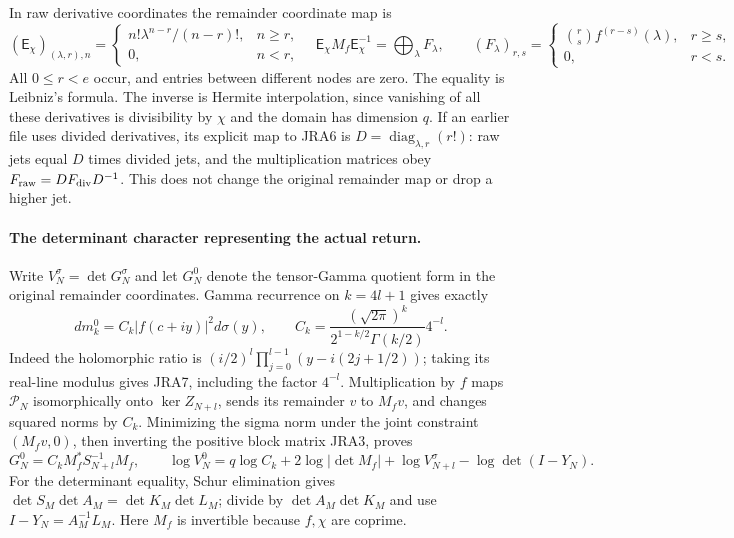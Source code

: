 \documentclass[11pt,a4paper]{article}
\newcommand{\diag}{\operatorname{diag}}
\begin{document}
In raw derivative coordinates the remainder coordinate map is
\begin{equation}
 (\mathsf E_\chi)_{(\lambda,r),n}
 =\begin{cases}n!\lambda^{n-r}/(n-r)!,&n\geq r,\\0,&n<r,\end{cases}
 \quad
 \mathsf E_\chi M_f\mathsf E_\chi^{-1}
 =\bigoplus_\lambda F_\lambda,\qquad
 (F_\lambda)_{r,s}=
 \begin{cases}\binom rs f^{(r-s)}(\lambda),&r\geq s,\\0,&r<s.\end{cases}
 \tag{JRA6}
\end{equation}
All $0\leq r<e$ occur, and entries between different nodes are zero.
The equality is Leibniz's formula.
The inverse is Hermite interpolation, since vanishing of all these
derivatives is divisibility by $\chi$ and the domain has dimension $q$.
If an earlier file uses divided derivatives, its explicit map to JRA6 is
$D=\diag_{\lambda,r}(r!)$: raw jets equal $D$ times divided jets, and
the multiplication matrices obey $F_{\rm raw}=D F_{\rm div}D^{-1}$.
This does not change the original remainder map or drop a higher jet.

\paragraph{The determinant character representing the actual return.}
Write $V_N^\sigma=\det G_N^\sigma$ and let $G_N^0$ denote the tensor-Gamma
quotient form in the original remainder coordinates. Gamma recurrence on
$k=4l+1$ gives exactly
\begin{equation}
 dm_k^0=C_k|f(c+iy)|^2d\sigma(y),\qquad
 C_k=\frac{(\sqrt{2\pi})^k}{2^{1-k/2}\Gamma(k/2)}4^{-l}.
 \tag{JRA7}
\end{equation}
Indeed the holomorphic ratio is $(i/2)^l\prod_{j=0}^{l-1}(y-i(2j+1/2))$;
taking its real-line modulus gives JRA7, including the factor $4^{-l}$.
Multiplication by $f$ maps $\mathcal P_N$ isomorphically onto
$\ker Z_{N+l}$, sends its remainder $v$ to $M_fv$, and changes squared
norms by $C_k$. Minimizing the sigma norm under the joint constraint
$(M_fv,0)$, then inverting the positive block matrix JRA3, proves
\begin{equation}
 G_N^0=C_kM_f^*S_{N+l}^{-1}M_f,\qquad
 \log V_N^0=q\log C_k+2\log|\det M_f|
            +\log V_{N+l}^\sigma-\log\det(I-Y_N).
 \tag{JRA8}
\end{equation}
For the determinant equality, Schur elimination gives
$\det S_M\det A_M=\det K_M\det L_M$; divide by
$\det A_M\det K_M$ and use $I-Y_N=A_M^{-1}L_M$.
Here $M_f$ is invertible because $f,\chi$ are coprime.
\end{document}

